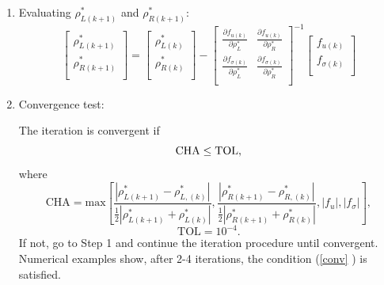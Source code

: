\documentclass{article}
\numberwithin{equation}{section}
\numberwithin{table}{section}
\begin{document}
\begin{enumerate}[Step 1]
  \item  Evaluating  $\rho_{L(k+1)}^*$ and $\rho_{R(k+1)}^*$:
\begin{equation}
\left[ \begin{array}{l}
 \rho _{L(k+1)}^*\\
\rho_{R(k+1)}^*\\
\end{array}
\right] =
\left[ \begin{array}{l}
 \rho _{L(k)}^*\\
\rho_{R(k)}^*\\
\end{array}
\right]-
\left[ \begin{array}{ll}
\frac{\partial f_{u(k)}}{\partial \rho_L^*} & \frac{\partial f_{u(k)}}{\partial \rho_R^*}\\
\frac{\partial f_{\sigma(k)}}{\partial \rho_L^*} & \frac{\partial f_{\sigma(k)}}{\partial \rho_R^*}\\
\end{array}
\right]^{-1}
\left[ \begin{array}{l}
f_{u(k)}\\
f_{\sigma(k)}\\
\end{array}
\right]
\end{equation}

\item Convergence test:

The iteration is convergent if
\begin{equation}{\label{conv}}
  \text{CHA} \le \text{TOL},
\end{equation}
where
\begin{equation}
\text{CHA} = \text{max} \left[
\frac{|\rho_{L(k+1)}^*- \rho_{L,(k)}^*|}{\frac{1}{2}|\rho_{L(k+1)}^*+\rho_{L(k)}^*|},   \frac{|\rho_{R(k+1)}^*- \rho_{R,(k)}^*|}{\frac{1}{2}|\rho_{R(k+1)}^*+\rho_{R(k)}^*|},|f_{u}|,|f_{\sigma}|\right],
\end{equation}
$$\text{TOL} = 10^{-4}.$$
If not, go to Step 1 and continue the iteration procedure until convergent. Numerical examples show, after 2-4 iterations, the condition (\ref{conv} ) is satisfied.
\end{enumerate}
\end{document}
